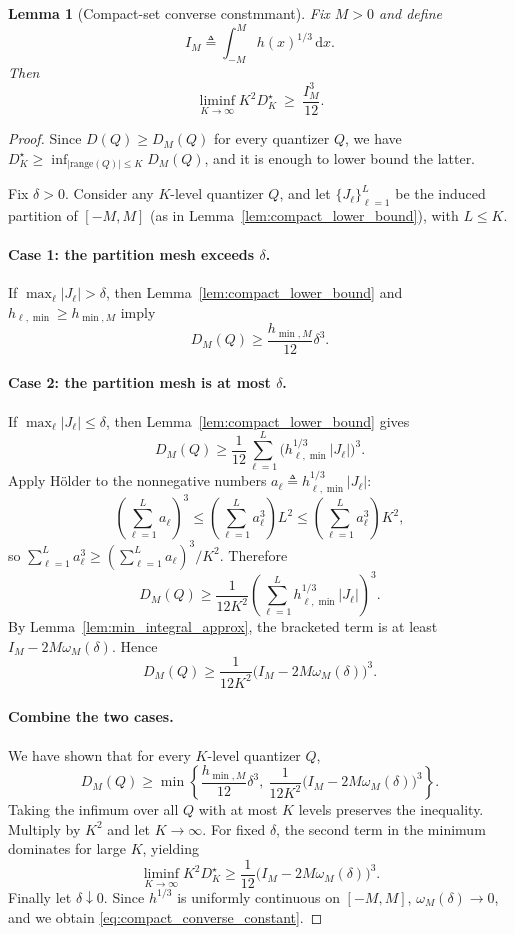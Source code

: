 \documentclass{article}
\newtheorem{lemma}{Lemma}
\newcommand{\abs}[1]{\left\lvert #1 \right\rvert}
\newcommand{\dd}{\,\mathrm{d}}
\newcommand{\defeq}{\triangleq}
\begin{document}
\begin{lemma}[Compact-set converse constmmant]\label{lem:compact_converse_constant}
Fix $M>0$ and define
\[
I_M\defeq \int_{-M}^{M} h(x)^{1/3}\dd x.
\]
Then
\begin{equation}\label{eq:compact_converse_constant}
\liminf_{K\to\infty} K^2 D_K^\star \ \ge\ \frac{I_M^3}{12}.
\end{equation}
\end{lemma}
\begin{proof}
Since $D(Q)\ge D_M(Q)$ for every quantizer $Q$, we have $D_K^\star\ge \inf_{\abs{\mathrm{range}(Q)}\le K} D_M(Q)$, and it is enough to lower bound the latter.

Fix $\delta>0$. Consider any $K$-level quantizer $Q$, and let $\{J_\ell\}_{\ell=1}^{L}$ be the induced partition of $[-M,M]$ (as in Lemma~\ref{lem:compact_lower_bound}), with $L\le K$.

\paragraph*{Case 1: the partition mesh exceeds $\delta$.}
If $\max_\ell \abs{J_\ell}>\delta$, then Lemma~\ref{lem:compact_lower_bound} and $h_{\ell,\min}\ge h_{\min,M}$ imply
\[
D_M(Q)\ge \frac{h_{\min,M}}{12}\delta^3.
\]

\paragraph*{Case 2: the partition mesh is at most $\delta$.}
If $\max_\ell \abs{J_\ell}\le\delta$, then Lemma~\ref{lem:compact_lower_bound} gives
\[
D_M(Q)\ge \frac{1}{12}\sum_{\ell=1}^{L}\bigl(h_{\ell,\min}^{1/3}\abs{J_\ell}\bigr)^3.
\]
Apply H\"older to the nonnegative numbers $a_\ell\defeq h_{\ell,\min}^{1/3}\abs{J_\ell}$:
\[
\left(\sum_{\ell=1}^{L} a_\ell\right)^3 \le \left(\sum_{\ell=1}^{L} a_\ell^3\right) L^2 \le \left(\sum_{\ell=1}^{L} a_\ell^3\right) K^2,
\]
so $\sum_{\ell=1}^{L} a_\ell^3\ge (\sum_{\ell=1}^{L} a_\ell)^3/K^2$. Therefore
\[
D_M(Q)\ge \frac{1}{12K^2}\left(\sum_{\ell=1}^{L} h_{\ell,\min}^{1/3}\abs{J_\ell}\right)^3.
\]
By Lemma~\ref{lem:min_integral_approx}, the bracketed term is at least $I_M-2M\omega_M(\delta)$. Hence
\[
D_M(Q)\ge \frac{1}{12K^2}\bigl(I_M-2M\omega_M(\delta)\bigr)^3.
\]

\paragraph*{Combine the two cases.}
We have shown that for every $K$-level quantizer $Q$,
\[
D_M(Q)\ge \min\left\{\frac{h_{\min,M}}{12}\delta^3,\ \frac{1}{12K^2}\bigl(I_M-2M\omega_M(\delta)\bigr)^3\right\}.
\]
Taking the infimum over all $Q$ with at most $K$ levels preserves the inequality. Multiply by $K^2$ and let $K\to\infty$. For fixed $\delta$, the second term in the minimum dominates for large $K$, yielding
\[
\liminf_{K\to\infty} K^2 D_K^\star \ge \frac{1}{12}\bigl(I_M-2M\omega_M(\delta)\bigr)^3.
\]
Finally let $\delta\downarrow 0$. Since $h^{1/3}$ is uniformly continuous on $[-M,M]$, $\omega_M(\delta)\to 0$, and we obtain \eqref{eq:compact_converse_constant}.
\end{proof}
\end{document}
